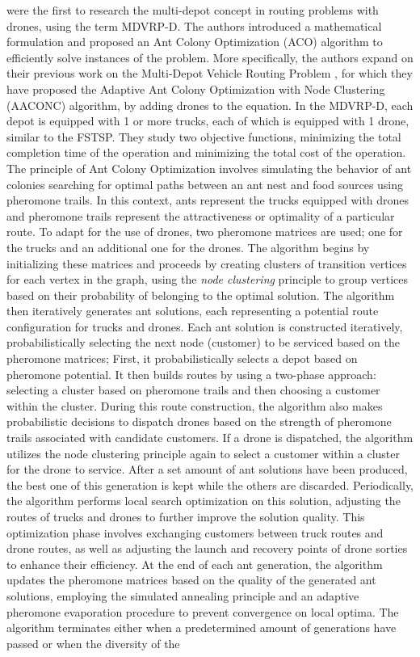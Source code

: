 \documentclass{article}
\begin{document}
	\par 
	\citeauthor{Stodola2024} \cite{Stodola2024} were the first to research the multi-depot concept in routing problems with drones, using the term MDVRP-D. The authors introduced a mathematical formulation and proposed an Ant Colony Optimization (ACO) algorithm to efficiently solve instances of the problem. More specifically, the authors expand on their previous work on the Multi-Depot Vehicle Routing Problem \cite{Stodola2022}, for which they have proposed the Adaptive Ant Colony Optimization with Node Clustering (AACONC) algorithm, by adding drones to the equation. In the MDVRP-D, each depot is equipped with 1 or more trucks, each of which is equipped with 1 drone, similar to the FSTSP. They study two objective functions, minimizing the total completion time of the operation and minimizing the total cost of the operation. The principle of Ant Colony Optimization involves simulating the behavior of ant colonies searching for optimal paths between an ant nest and food sources using pheromone trails. In this context, ants represent the trucks equipped with drones and pheromone trails represent the attractiveness or optimality of a particular route. To adapt for the use of drones, two pheromone matrices are used; one for the trucks and an additional one for the drones. The algorithm begins by initializing these matrices and proceeds by creating clusters of transition vertices for each vertex in the graph, using the \textit{node clustering} principle \cite{Stodola2020} to group vertices based on their probability of belonging to the optimal solution. The algorithm then iteratively generates ant solutions, each representing a potential route configuration for trucks and drones. Each ant solution is constructed iteratively, probabilistically selecting the next node (customer) to be serviced based on the pheromone matrices; First, it probabilistically selects a depot based on pheromone potential. It then builds routes by using a two-phase approach: selecting a cluster based on pheromone trails and then choosing a customer within the cluster. During this route construction, the algorithm also makes probabilistic decisions to dispatch drones based on the strength of pheromone trails associated with candidate customers. If a drone is dispatched, the algorithm utilizes the node clustering principle again to select a customer within a cluster for the drone to service. After a set amount of ant solutions have been produced, the best one of this generation is kept while the others are discarded. Periodically, the algorithm performs local search optimization on this solution, adjusting the routes of trucks and drones to further improve the solution quality. This optimization phase involves exchanging customers between truck routes and drone routes, as well as adjusting the launch and recovery points of drone sorties to enhance their efficiency. At the end of each ant generation, the algorithm updates the pheromone matrices based on the quality of the generated ant solutions, employing the simulated annealing principle and an adaptive pheromone evaporation procedure to prevent convergence on local optima. The algorithm terminates either when a predetermined amount of generations have passed or when the diversity of the 
\end{document}
